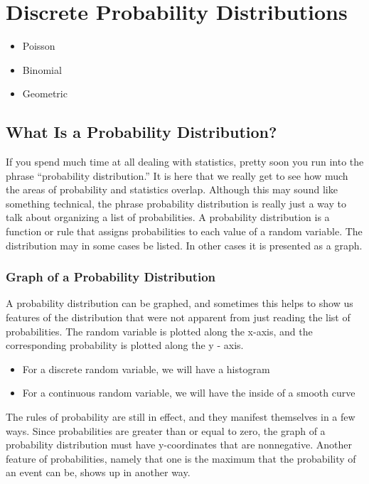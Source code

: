\newpage
\section{Discrete Probability Distributions}

\begin{itemize}
\item Poisson
\item Binomial
\item Geometric
\end{itemize}


\subsection{What Is a Probability Distribution?}
If you spend much time at all dealing with statistics, pretty soon you run into the phrase “probability distribution.” It is here that we really get to see how much the areas of probability and statistics overlap. Although this may sound like something technical, the phrase probability distribution is really just a way to talk about organizing a list of probabilities. A probability distribution is a function or rule that assigns probabilities to each value of a random variable. The distribution may in some cases be listed. In other cases it is presented as a graph.


\subsubsection{Graph of a Probability Distribution}

A probability distribution can be graphed, and sometimes this helps to show us features of the distribution that were not apparent from just reading the list of probabilities. The random variable is plotted along the x-axis, and the corresponding probability is plotted along the y - axis.

\begin{itemize}
\item For a discrete random variable, we will have a histogram
\item For a continuous random variable, we will have the inside of a smooth curve
\end{itemize}

The rules of probability are still in effect, and they manifest themselves in a few ways. Since probabilities are greater than or equal to zero, the graph of a probability distribution must have y-coordinates that are nonnegative. Another feature of probabilities, namely that one is the maximum that the probability of an event can be, shows up in another way.

